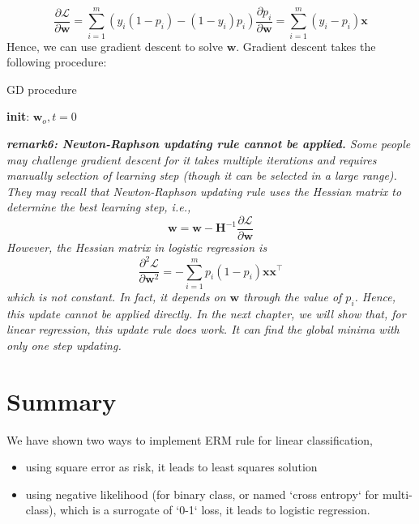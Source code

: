 \documentclass{article}
\begin{document}
	$$\frac{\partial \mathcal{L}}{\partial \mathbf{w}} = \sum_{i=1}^m \left( y_i (1-p_i) - (1-y_i) p_i \right) \frac{\partial p_i}{\partial \mathbf{w}} = \sum_{i=1}^m (y_i -p_i) \mathbf{x}$$
Hence, we can use gradient descent to solve $\mathbf{w}$. Gradient descent takes the following procedure:
		
	\begin{algorithm}[]
	\caption{GD procedure}
	\LinesNumbered 
	\textbf{init}: $\mathbf{w}_o, t=0$
	\end{algorithm}

	\begin{framed}
	\begin{scriptsize}
	\begin{spacing}{1.2}
	\noindent\textit{\textbf{remark6: Newton-Raphson updating rule cannot be applied.}  Some people may challenge gradient descent for it takes multiple iterations and requires manually selection of learning step (though it can be selected in a large range). They may recall that Newton-Raphson updating rule uses the Hessian matrix to determine the best learning step, i.e.,}
	$$\mathbf{w} = \mathbf{w} - \mathbf{H}^{-1} \frac{\partial \mathcal{L}}{\partial \mathbf{w}} $$
	\textit{However, the Hessian matrix in logistic regression is}
	$$\frac{\partial^2 \mathcal{L}}{\partial \mathbf{w}^2} = -\sum_{i=1}^m p_i (1-p_i) \mathbf{x}  \mathbf{x}^\top $$
\textit{which is not constant. In fact, it depends on $\mathbf{w}$ through the value of $p_i$. Hence, this update cannot be applied directly. In the next chapter, we will show that, for linear regression, this update rule does work. It can find the global minima with only one step updating.}
	\end{spacing}
	\end{scriptsize}
	\end{framed}
	
\section{Summary}

We have shown two ways to implement ERM rule for linear classification,
\begin{itemize}
\item using square error as risk, it leads to least squares solution
\item using negative likelihood (for binary class, or named `cross entropy`  for multi-class), which is a surrogate of `0-1` loss, it leads to logistic regression.
\end{itemize}
\end{document}
